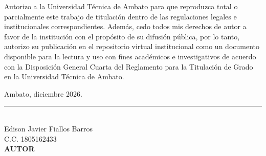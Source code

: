 
Autorizo a la Universidad Técnica de Ambato para que reproduzca total o parcialmente este trabajo de titulación dentro de las regulaciones legales e institucionales correspondientes. Además, cedo todos mis derechos de autor a favor de la institución con el propósito de su difusión pública, por lo tanto, autorizo su publicación en el repositorio virtual institucional como un documento disponible para la lectura y uso con fines académicos e investigativos de acuerdo con la Disposición General Cuarta del Reglamento para la Titulación de Grado en la Universidad Técnica de Ambato.

\vspace{2em}
\begin{flushright}
    Ambato, diciembre 2026.
\end{flushright}
\vspace{4em}
\begin{center}
    \rule{6cm}{0.4pt}\\[0.2cm]
    Edison Javier Fiallos Barros\\
    C.C. 1805162433\\[0.1cm]
    \textbf{AUTOR}
\end{center}